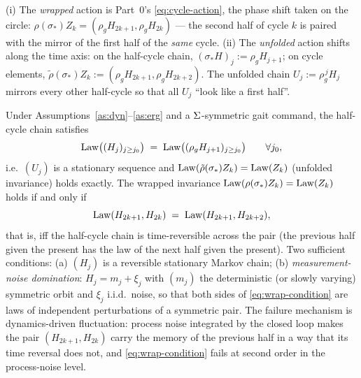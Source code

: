 \begin{definition}
\label{def:wrapped-unfolded}
(i) The \emph{wrapped} action is Part~0's \eqref{eq:cycle-action}, the phase
shift taken on the circle: $\rho(\sigma_*) Z_k = (\rho_g H_{2k+1}, \rho_g H_{2k})$
--- the second half of cycle $k$ is paired with the mirror of the first
half of the \emph{same} cycle. (ii) The \emph{unfolded} action shifts along
the time axis: on the half-cycle chain, $(\sigma_* H)_j := \rho_g H_{j+1}$;
on cycle elements, $\tilde\rho(\sigma_*) Z_k := (\rho_g H_{2k+1}, \rho_g H_{2k+2})$.
The unfolded chain $U_j := \rho_g^{\,j} H_j$ mirrors every other half-cycle
so that all $U_j$ ``look like a first half''.
\end{definition}

\begin{proposition}
\label{prop:wrap}
Under Assumptions~\ref{as:dyn}--\ref{as:erg} and a $\Sigma$-symmetric gait
command, the half-cycle chain satisfies
\begin{equation}
  \label{eq:unfolded-invariance}
  \operatorname{Law}\bigl((H_j)_{j \ge j_0}\bigr) \;=\; \operatorname{Law}\bigl((\rho_g H_{j+1})_{j \ge j_0}\bigr)
  \qquad \forall j_0,
\end{equation}
i.e.\ $(U_j)$ is a stationary sequence and $\operatorname{Law}(\tilde\rho(\sigma_*)Z_k) =
\operatorname{Law}(Z_k)$ (unfolded invariance) holds exactly. The wrapped invariance
$\operatorname{Law}(\rho(\sigma_*)Z_k) = \operatorname{Law}(Z_k)$ holds if and only if
\begin{equation}
  \label{eq:wrap-condition}
  \operatorname{Law}(H_{2k+1}, H_{2k}) \;=\; \operatorname{Law}(H_{2k+1}, H_{2k+2}),
\end{equation}
that is, iff the half-cycle chain is time-reversible across the pair
(the previous half given the present has the law of the next half given
the present). Two sufficient conditions: (a) $(H_j)$ is a reversible
stationary Markov chain; (b) \emph{measurement-noise domination}:
$H_j = m_j + \xi_j$ with $(m_j)$ the deterministic (or slowly varying)
symmetric orbit and $\xi_j$ i.i.d.\ noise, so that both sides of
\eqref{eq:wrap-condition} are laws of independent perturbations of a
symmetric pair. The failure mechanism is dynamics-driven fluctuation:
process noise integrated by the closed loop makes the pair
$(H_{2k+1}, H_{2k})$ carry the memory of the previous half in a way that its
time reversal does not, and \eqref{eq:wrap-condition} fails at second order in
the process-noise level.
\end{proposition}

